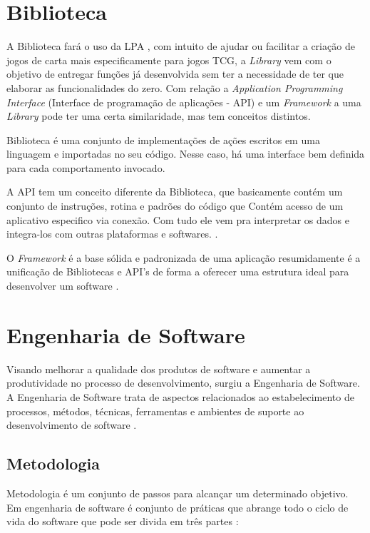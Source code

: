 \section{Biblioteca}

A Biblioteca fará o uso da LPA , com intuito de ajudar ou facilitar a criação de jogos de carta mais especificamente para jogos TCG, a \textit{Library} vem com o objetivo de entregar funções já desenvolvida sem ter a necessidade de ter que elaborar as funcionalidades do zero. Com relação a \textit{Application Programming Interface} (Interface de programação de aplicações - API) e um \textit{Framework} a uma \textit{Library} pode ter uma certa similaridade, mas tem conceitos distintos.

Biblioteca é uma conjunto de implementações de ações escritos em uma linguagem e importadas no seu código. Nesse caso, há uma interface bem definida para cada comportamento invocado.

A API tem um conceito diferente da Biblioteca, que basicamente contém um conjunto de instruções, rotina e padrões do código que Contém acesso de um aplicativo especifico via conexão. Com tudo ele vem pra interpretar os dados e integra-los com outras plataformas e softwares. \cite{api-2016}.

O \textit{Framework} é a base sólida e padronizada de uma aplicação resumidamente é a unificação de Bibliotecas e API’s de forma a oferecer uma estrutura ideal para desenvolver um software \cite{abf-2016}.


\section{Engenharia de Software}

Visando melhorar a qualidade dos produtos de software e aumentar a produtividade no processo de desenvolvimento, surgiu a Engenharia de Software. A Engenharia de Software trata de aspectos relacionados ao estabelecimento de processos, métodos, técnicas, ferramentas e ambientes de suporte ao desenvolvimento de software \cite[p. 2]{eng-2014}.

\subsection{Metodologia}

Metodologia é um conjunto de passos para alcançar um determinado objetivo. Em engenharia de software é conjunto de práticas que abrange todo o ciclo de vida do software que pode ser divida em três partes \cite{almeida-2017}:

